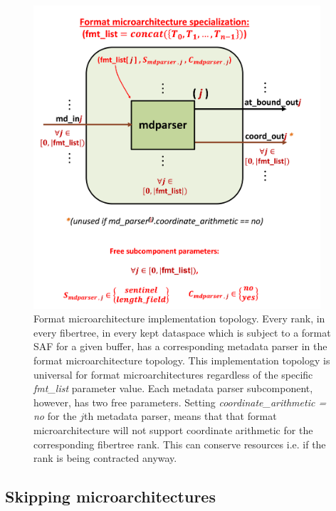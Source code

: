 \begin{figure}[H]
    \centering
    \includegraphics[width=0.95\textwidth]{figures/FMT_all.png}
    \caption{Format microarchitecture implementation topology. Every rank, in every fibertree, in every kept dataspace which is subject to a format SAF for a given buffer, has a corresponding metadata parser in the format microarchitecture topology. This implementation topology is universal for format microarchitectures regardless of the specific \textit{fmt\_list} parameter value. Each metadata parser subcomponent, however, has two free parameters. Setting \textit{coordinate\_arithmetic = no} for the $j$th metadata parser, means that that format microarchitecture will not support coordinate arithmetic for the corresponding fibertree rank. This can conserve resources i.e. if the rank is being contracted anyway.}
    \label{fig:FMT_all}
\end{figure}

\subsection{Skipping microarchitectures}

